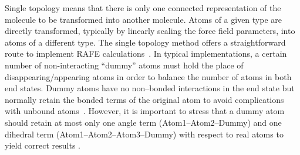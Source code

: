 \documentclass[journal=jctcce,manuscript=article]{achemso}
\begin{document}
Single topology means that there is only one connected representation of the molecule to be transformed into another molecule.
Atoms of a given type are directly transformed, typically by linearly scaling the force field parameters, into atoms of a different type.
The single topology method \cite{doi:10.1021/j100056a020, Michel2010,doi:10.1063/1.449208,doi:10.1021/j100056a020, doi:10.1021/jp981628n}
offers a straightforward route to implement RAFE calculations~\cite{doi:10.1021/j100056a020, Michel2010}.
In typical implementations,
a certain number of non-interacting ``dummy'' atoms must hold the place of disappearing/appearing atoms in order to balance the number of atoms in both end states.
Dummy atoms have no non--bonded interactions in the end state but normally retain the bonded
terms of the original atom to avoid complications with unbound
atoms~\cite{doi:10.1021/jp981628n}.
However, it is important to stress that a dummy atom should retain at most only
one angle term (Atom1--Atom2--Dummy) and one dihedral term
(Atom1--Atom2--Atom3--Dummy) with respect to real atoms
to yield correct results \cite{doi:10.1021/jp981628n,doi:10.1021/jp994193s}.
%
%
\end{document}
